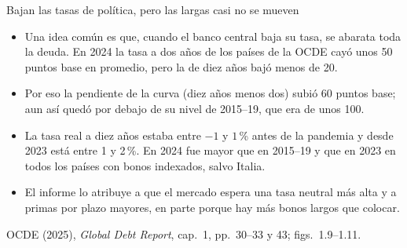 \documentclass[aspectratio=169,11pt]{beamer}
\newcommand{\fuente}[1]{\par\vfill{\small\color{cGris}#1\par}}
\newcommand{\GDR}{OCDE (2025), \emph{Global Debt Report}}
\begin{document}
\begin{frame}{Bajan las tasas de política, pero las largas casi no se mueven}
  \begin{itemize}
    \item<1-> Una idea común es que, cuando el banco central baja su tasa, se abarata toda la deuda. En 2024 la tasa a dos años de los países de la OCDE cayó unos 50 puntos base en promedio, pero la de diez años bajó menos de 20.
    \item<2-> Por eso la pendiente de la curva (diez años menos dos) subió 60 puntos base; aun así quedó por debajo de su nivel de 2015--19, que era de unos 100.
    \item<3-> La tasa real a diez años estaba entre $-1$ y $1$\,\% antes de la pandemia y desde 2023 está entre 1 y 2\,\%. En 2024 fue mayor que en 2015--19 y que en 2023 en todos los países con bonos indexados, salvo Italia.
    \item<4-> El informe lo atribuye a que el mercado espera una tasa neutral más alta y a primas por plazo mayores, en parte porque hay más bonos largos que colocar.
  \end{itemize}
  \fuente{\GDR, cap.~1, pp.~30--33 y 43; figs.~1.9--1.11.}
\end{frame}
\end{document}
